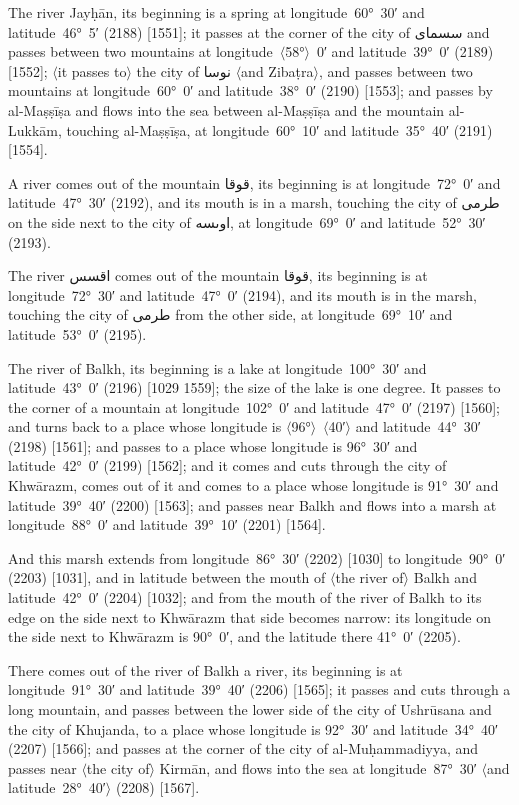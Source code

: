 \documentclass[11pt]{article}
\newcommand{\Pg}[1]{\marginpar{\footnotesize #1}}
\newcommand{\Ang}[1]{\ensuremath{#1}}
\begin{document}
The river Jayḥān, its beginning is a spring at longitude~60°~30′ and latitude~46°~5′ (2188) [1551]; it passes at the corner of the city of \textarabic{سسماى} and passes between two mountains at longitude~\Ang{\langle}58°\Ang{\rangle}~0′ and latitude~39°~0′ (2189) [1552]; \Ang{\langle}it passes to\Ang{\rangle} the city of \textarabic{نوسا} \Ang{\langle}and Zibaṭra\Ang{\rangle}, and passes between two mountains at longitude~60°~0′ and latitude~38°~0′ (2190) [1553]; and passes by al-Maṣṣīṣa and flows into the sea between al-Maṣṣīṣa and the mountain al-Lukkām, touching al-Maṣṣīṣa, at longitude~60°~10′ and latitude~35°~40′ (2191) [1554].

A river comes out of the mountain \textarabic{قوقا}, its beginning is at longitude~72°~0′ and latitude~47°~30′ (2192), and its mouth is in a marsh, touching the city of \textarabic{طرمى} on the side next to the city of \textarabic{اوٮسه}, at longitude~69°~0′ and latitude~52°~30′ (2193).

The river \textarabic{اقسس} comes out of the mountain \textarabic{قوقا}, its beginning is at longitude~72°~30′ and latitude~47°~0′ (2194), and its mouth is in the marsh, touching the city of \textarabic{طرمى} from the other side, at longitude~69°~10′ and latitude~53°~0′ (2195).

The river of Balkh, its beginning is a lake at longitude~100°~30′ and latitude~43°~0′ (2196) [1029 1559]; the size of the lake is one degree. It passes to the corner of a mountain at longitude~102°~0′ and latitude~47°~0′ (2197) [1560]; and turns back to a place whose longitude is \Ang{\langle}96°\Ang{\rangle}~\Ang{\langle}40′\Ang{\rangle} and latitude~44°~30′ (2198) [1561]; and passes to a place whose longitude is 96°~30′ and latitude~42°~0′ (2199) [1562]; and it comes and cuts through the city of Khwārazm, comes out of it and comes to a place whose longitude is 91°~30′ and latitude~39°~40′ (2200) [1563]; and passes near Balkh and flows into a marsh at longitude~88°~0′ and latitude~39°~10′ (2201) [1564].

And this marsh extends from longitude~86°~30′ (2202) [1030] to longitude~90°~0′ (2203) [1031]\Pg{p. 146}, and in latitude between the mouth of \Ang{\langle}the river of\Ang{\rangle} Balkh and latitude~42°~0′ (2204) [1032]; and from the mouth of the river of Balkh to its edge on the side next to Khwārazm that side becomes narrow: its longitude on the side next to Khwārazm is 90°~0′, and the latitude there 41°~0′ (2205).

There comes out of the river of Balkh a river, its beginning is at longitude~91°~30′ and latitude~39°~40′ (2206) [1565]; it passes and cuts through a long mountain, and passes between the lower side of the city of Ushrūsana and the city of Khujanda, to a place whose longitude is 92°~30′ and latitude~34°~40′ (2207) [1566]; and passes at the corner of the city of al-Muḥammadiyya, and passes near \Ang{\langle}the city of\Ang{\rangle} Kirmān, and flows into the sea at longitude~87°~30′ \Ang{\langle}and latitude~28°~40′\Ang{\rangle} (2208) [1567].
\end{document}
